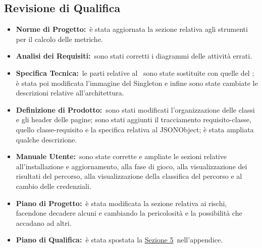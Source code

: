 	\subsection{Revisione di Qualifica}
	\label{revisioneDiQualifica}
		\begin{itemize}
			\item \textbf{Norme di Progetto:}\ è stata aggiornata la sezione relativa agli strumenti per il calcolo delle metriche.
			\item \textbf{Analisi dei Requisiti:}\ sono stati corretti i diagrammi delle attività errati.
			\item \textbf{Specifica Tecnica:}\ le parti relative al \ sono state sostituite con quelle del ; è stata poi modificata l'immagine del Singleton e infine sono state cambiate le descrizioni relative all'architettura.
			\item \textbf{Definizione di Prodotto:}\ sono stati modificati l'organizzazione delle classi e gli header delle pagine; sono stati aggiunti il tracciamento requisito-classe, quello classe-requisito e la specifica relativa al JSONObject; è stata ampliata qualche descrizione.
			\item \textbf{Manuale Utente:}\ sono state corrette e ampliate le sezioni relative all'installazione e aggiornamento, alla fase di gioco, alla visualizzazione dei risultati del percorso, alla visualizzazione della classifica del percorso e al cambio delle credenziali.
			\item \textbf{Piano di Progetto:}\ è stata modificata la sezione relativa ai rischi, facendone decadere alcuni e cambiando la pericolosità e la possibilità che accadano ad altri.
			\item \textbf{Piano di Qualifica:}\ è stata spostata la \hyperref[resocontoDellAttivitaDiVerifica]{Sezione 5}\ nell'appendice.
		\end{itemize}